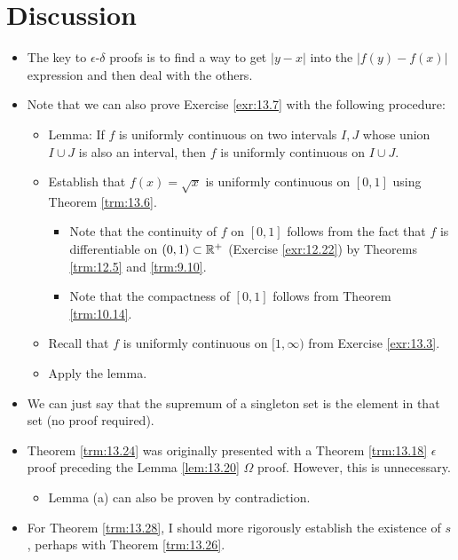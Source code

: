 \documentclass{report}
\begin{document}



\section{Discussion}
\begin{itemize}
    \item {}The key to $\epsilon$-$\delta$ proofs is to find a way to get $|y-x|$ into the $|f(y)-f(x)|$ expression and then deal with the others.
    \item {}Note that we can also prove Exercise \ref{exr:13.7} with the following procedure:
    \begin{itemize}
        \item Lemma: If $f$ is uniformly continuous on two intervals $I,J$ whose union $I\cup J$ is also an interval, then $f$ is uniformly continuous on $I\cup J$.
        \item Establish that $f(x)=\sqrt{x}$ is uniformly continuous on $[0,1]$ using Theorem \ref{trm:13.6}.
        \begin{itemize}
            \item Note that the continuity of $f$ on $[0,1]$ follows from the fact that $f$ is differentiable on $(0,1)\subset\mathbb{R}^+$ (Exercise \ref{exr:12.22}) by Theorems \ref{trm:12.5} and \ref{trm:9.10}.
            \item Note that the compactness of $[0,1]$ follows from Theorem \ref{trm:10.14}.
        \end{itemize}
        \item Recall that $f$ is uniformly continuous on $[1,\infty)$ from Exercise \ref{exr:13.3}.
        \item Apply the lemma.
    \end{itemize}
    \item {}We can just say that the supremum of a singleton set is the element in that set (no proof required).
    \item {}Theorem \ref{trm:13.24} was originally presented with a Theorem \ref{trm:13.18} $\epsilon$ proof preceding the Lemma \ref{lem:13.20} $\Omega$ proof. However, this is unnecessary.
    \begin{itemize}
        \item Lemma (a) can also be proven by contradiction.
    \end{itemize}
    \item {}For Theorem \ref{trm:13.28}, I should more rigorously establish the existence of $s$, perhaps with Theorem \ref{trm:13.26}.
\end{itemize}
\end{document}
